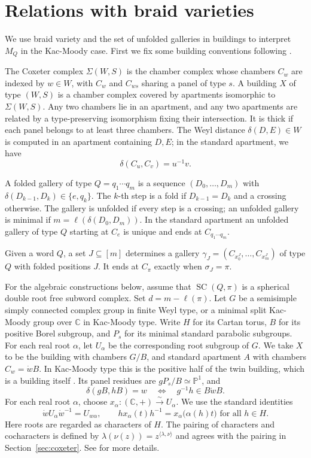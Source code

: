 \documentclass[11pt,a4paper]{article}
\theoremstyle{definition}
\theoremstyle{remark}
\newcommand{\SC}{\operatorname{SC}}
\numberwithin{equation}{section}
\newcommand{\C}{\mathbb C}
\begin{document}
\section{Relations with braid varieties}
\label{sec:complex}
We use braid variety and the set of unfolded galleries in buildings to interpret $M_Q$ in the Kac-Moody case. First we fix some building conventions following \cite{AB}.

The Coxeter complex $\Sigma(W,S)$ is the chamber complex whose chambers $C_w$ are indexed by $w\in W$, with $C_w$ and $C_{ws}$ sharing a panel of type $s$. A building $X$ of type $(W,S)$ is a chamber complex covered by apartments isomorphic to $\Sigma(W,S)$. Any two chambers lie in an apartment, and any two apartments are related by a type-preserving isomorphism fixing their intersection. It is thick if each panel belongs to at least three chambers. The Weyl distance $\delta(D,E)\in W$ is computed in an apartment containing $D,E$; in the standard apartment, we have
\[
 \delta(C_u,C_v)=u^{-1}v.
\]

A folded gallery of type $Q=q_1\cdots q_m$ is a sequence
$(D_0,\ldots,D_m)$ with
$\delta(D_{k-1},D_k)\in\{e,q_k\}$.
The $k$-th step is a fold if $D_{k-1}=D_k$ and a crossing otherwise. The gallery is unfolded if every step is a crossing; an unfolded gallery is minimal if $m=\ell(\delta(D_0,D_m))$.
In the standard apartment an unfolded gallery
of type $Q$ starting at $C_e$ is unique and ends at
$C_{q_1\cdots q_m}$.

Given a word $Q$, a set $J\subseteq[m]$ determines a gallery
$\gamma_J=(C_{x_0^J},\ldots,C_{x_m^J})$ of type $Q$ with folded positions $J$. It ends at $C_\pi$ exactly when $\sigma_J=\pi$. 

For the algebraic constructions below, assume that $\SC(Q,\pi)$
is a spherical double root free subword complex. Set $d=m-\ell(\pi)$.
Let $G$ be a semisimple simply connected complex group in finite Weyl type, or a minimal split Kac-Moody group over $\C$ in Kac-Moody type. Write $H$ for its Cartan torus, $B$ for its positive Borel subgroup, and $P_s$ for its minimal standard parabolic subgroups. For each real root $\alpha$, let $U_\alpha$ be the corresponding root subgroup of $G$. We take $X$ to be the building with chambers $G/B$, and standard apartment $A$ with
chambers $C_w=\dot wB$. In Kac-Moody type this is the positive half of the twin building, which is a building itself \cite{AB}. Its panel residues are $gP_s/B\simeq\mathbb P^1$, and
\[
 \delta(gB,hB)=w\quad\Longleftrightarrow\quad
 g^{-1}h\in B\dot wB.
\]
For each real root $\alpha$, choose
$x_\alpha:(\C,+)\xrightarrow{\sim}U_\alpha$. We use the standard
identities
\begin{equation}\label{eq:root-group-actions}
 \dot wU_\alpha\dot w^{-1}=U_{w\alpha},\qquad
 h x_\alpha(t)h^{-1}=x_\alpha\bigl(\alpha(h)t\bigr)
 \text{ for all } h\in H.
\end{equation}
Here roots are regarded as characters of $H$. The pairing of
characters and cocharacters is defined by
$\lambda(\nu(z))=z^{\langle\lambda,\nu\rangle}$ and agrees with the pairing in Section~\ref{sec:coxeter}. See \cite{Kumar} for more details.
\end{document}
